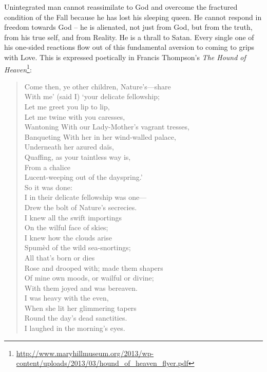 Unintegrated man cannot reassimilate to God and overcome the fractured condition of the Fall because he has lost his sleeping queen. He cannot respond in freedom towards God -- he is alienated, not just from God, but from the truth, from his true self, and from Reality. He is a thrall to Satan. Every single one of his one-sided reactions flow out of this fundamental aversion to coming to grips with Love. This is expressed poetically in Francis Thompson's \emph{The Hound of Heaven}\footnote{\url{http://www.maryhillmuseum.org/2013/wp-content/uploads/2013/03/hound\_of\_heaven\_flyer.pdf}}:

\begin{quotex}
\begin{verse}
Come then, ye other children, Nature's---share\\
With me' (said I) `your delicate fellowship;\\
Let me greet you lip to lip,\\
Let me twine with you caresses,\\
Wantoning With our Lady-Mother's vagrant tresses,\\
Banqueting With her in her wind-walled palace,\\
Underneath her azured daïs,\\
Quaffing, as your taintless way is,\\
From a chalice\\
Lucent-weeping out of the dayspring.'\\
So it was done:\\
I in their delicate fellowship was one---\\
Drew the bolt of Nature's secrecies.\\
I knew all the swift importings\\
On the wilful face of skies;\\
I knew how the clouds arise\\
Spumèd of the wild sea-snortings;\\
All that's born or dies\\
Rose and drooped with; made them shapers\\
Of mine own moods, or wailful or divine;\\
With them joyed and was bereaven.\\
I was heavy with the even,\\
When she lit her glimmering tapers\\
Round the day's dead sanctities.\\
I laughed in the morning's eyes.\\

\end{verse}
\end{quotex}
